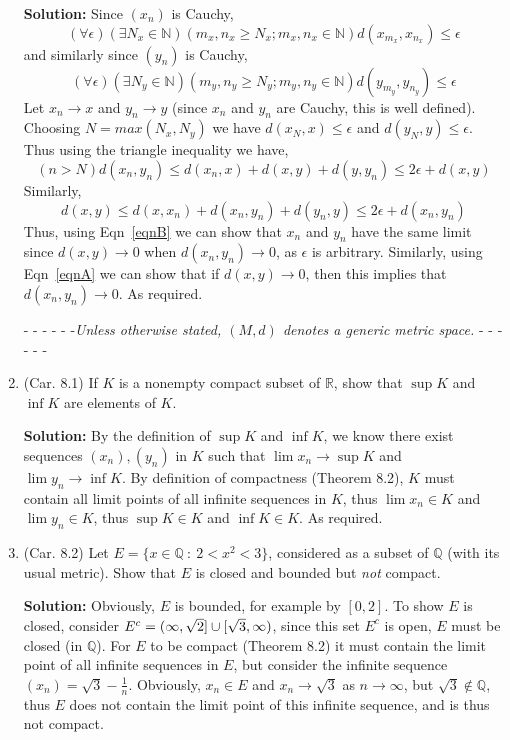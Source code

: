 \documentclass{article}
\def\ge{\geqslant}
\def\le{\leqslant}
\def\to{\rightarrow}
\def\NN{\mathbb N}
\def\QQ{\mathbb Q}
\def\RR{\mathbb R}
\begin{document}
\begin{enumerate}
\textbf{Solution:} Since $(x_n)$ is Cauchy,
\[
(\forall \epsilon)(\exists N_x \in \NN)(m_x,n_x \ge N_x; m_x,n_x\in \NN) 
d(x_{m_x},x_{n_x}) \le \epsilon
\]
and similarly since $(y_n)$ is Cauchy,
\[
(\forall \epsilon)(\exists N_y \in \NN)(m_y,n_y \ge N_y; m_y,n_y\in \NN)
d(y_{m_y},y_{n_y}) \le \epsilon
\]
Let $x_n\to x$ and $y_n \to y$ (since $x_n$ and $y_n$ are Cauchy, this
is well defined).
Choosing $N=max(N_x,N_y)$ we have $d(x_N,x) \le \epsilon$ and
$d(y_N,y) \le \epsilon$.  Thus using the triangle inequality we have,
\begin{equation}
(n>N) d(x_n,y_n)  \le d(x_n,x) + d(x,y) + d(y,y_n) \le 2\epsilon+d(x,y) \label{eqnA}
\end{equation}
Similarly,
\begin{equation}
d(x,y) \le d(x,x_n) + d(x_n,y_n) + d(y_n,y) \le 2\epsilon+d(x_n,y_n)\label{eqnB}
\end{equation}
Thus, using Eqn~\ref{eqnB} we can show that $x_n$ and $y_n$ have the same limit
since $d(x,y)\to 0$ when $d(x_n,y_n)\to 0$, as $\epsilon$ is arbitrary. 
Similarly, using Eqn~\ref{eqnA} we can show that if $d(x,y)\to 0$, then
this implies that $d(x_n,y_n)\to 0$. As required.

 - - - - - -\textit{Unless otherwise stated, $(M,d)$ denotes a generic metric space.} - - - - - -

\item (Car. 8.1) If $K$ is a nonempty compact subset of $\RR$, show that $\sup K$ and $\inf K$ are elements of $K$.


\textbf{Solution:} 
By the definition of $\sup K$ and $\inf K$, we know
there exist sequences $(x_n),(y_n)$ in $K$ such that $\lim x_n \to \sup K$
and $\lim y_n \to \inf K$. By definition of compactness (Theorem 8.2), 
$K$ must contain
all limit points of all infinite sequences in $K$, thus $\lim x_n \in K$
and $\lim y_n \in K$, thus $\sup K \in K$ and $\inf K\in K$. As required.

\item (Car. 8.2) Let $E = \{ x \in \QQ\ :\ 2 < x^2 < 3 \}$, considered as a subset of $\QQ$ (with its usual metric). Show that $E$ is closed and bounded but \textit{not} compact.

\textbf{Solution:} Obviously, $E$ is bounded, for example by $[0,2]$. To
show $E$ is closed, consider $E^c=(\-\infty,\sqrt{2}] \cup [\sqrt{3},\infty)$, 
since this set $E^c$ is open, $E$ must be closed (in $\QQ$). For $E$ to
be compact (Theorem 8.2) it must contain the limit 
point of all infinite sequences
in $E$, but consider the infinite sequence $(x_n)=\sqrt{3}-\frac{1}{n}$.
Obviously, $x_n\in E$ and $x_n \to \sqrt{3}$ as $n \to \infty$, but $\sqrt{3} \notin \QQ$, thus
$E$ does not contain the limit point of this infinite sequence, and is thus
not compact. 


\end{enumerate}
\end{document}
